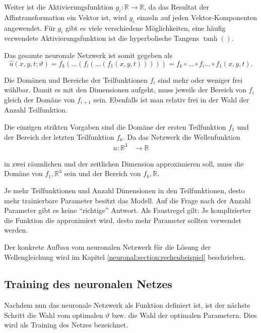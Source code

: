 Weiter ist die Aktivierungsfunktion \( g_i\colon \mathbb{R} \longrightarrow\mathbb{R} \), da das Resultat der Affintransformation ein Vektor ist, wird \( g_i \) einzeln auf jeden Vektor-Komponenten angewendet.
Für \( g_i \) gibt es viele verschiedene Möglichkeiten, eine häufig verwendete Aktivierungsfunktion ist die hyperbolische Tangens \( \tanh() \).

Das gesamte neuronale Netzwerk ist somit gegeben als
\begin{equation}
    \hat{u}(x, y, t; \vartheta) = f_k(\ldots(f_i(\ldots(f_1(x, y, t))))) = f_k \circ \ldots \circ f_i \ldots \circ f_1(x, y, t).
    \label{neuronal:nn_ausformuliert}
\end{equation}

Die Domänen und Bereiche der Teilfunktionen \( f_i \) sind mehr oder weniger frei wählbar.
Damit es mit den Dimensionen aufgeht, muss jeweils der Bereich von \( f_i \) gleich der Domäne von \( f_{i+1} \) sein.
Ebenfalls ist man relativ frei in der Wahl der Anzahl Teilfunktion.

Die einzigen strikten Vorgaben sind die Domäne der ersten Teilfunktion \( f_1 \) und der Bereich der letzten Teilfunktion \( f_k \).
Da das Netzwerk die Wellenfunktion
\begin{align*}
    u\colon \mathbb{R}^3 & \longrightarrow\mathbb{R}
\end{align*}

in zwei räumlichen und der zeitlichen Dimension approximieren soll, muss die Domäne von \( f_1, \mathbb{R}^3\) sein und der Bereich von \( f_k, \mathbb{R}\).

Je mehr Teilfunktionen und Anzahl Dimensionen in den Teilfunktionen, desto mehr trainierbare Parameter besitzt das Modell.
Auf die Frage nach der Anzahl Parameter gibt es keine ``richtige'' Antwort.
Als Faustregel gilt: Je komplizierter die Funktion die approximiert wird, desto mehr Parameter sollten verwendet werden.

Der konkrete Aufbau vom neuronalen Netzwerk für die Lösung der Wellengleichung wird im Kapitel \ref{neuronal:section:rechenbeispiel} beschrieben.


\subsection{Training des neuronalen Netzes}\label{neuronal:subsection:training_nn}

Nachdem nun das neuronale Netzwerk als Funktion definiert ist, ist der nächste Schritt die Wahl vom optimalen \( \vartheta \) bzw. die Wahl der optimalen Parametern.
Dies wird als Training des Netzes bezeichnet.


